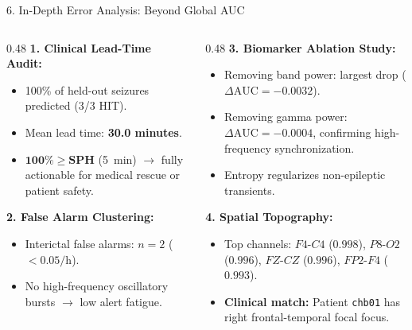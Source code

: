 \documentclass[aspectratio=169,10pt]{beamer}
\begin{document}
\begin{frame}{6. In-Depth Error Analysis: Beyond Global AUC}
\begin{columns}[T]
\begin{column}{0.48\textwidth}
\textbf{1. Clinical Lead-Time Audit:}
\begin{itemize}
    \item 100\% of held-out seizures predicted (3/3 HIT).
    \item Mean lead time: \textbf{30.0 minutes}.
    \item $\mathbf{100\% \ge SPH}$ (5~min) $\to$ fully actionable for medical rescue or patient safety.
\end{itemize}

\vspace{0.2cm}
\textbf{2. False Alarm Clustering:}
\begin{itemize}
    \item Interictal false alarms: $n=2$ ($<0.05/\text{h}$).
    \item No high-frequency oscillatory bursts $\to$ low alert fatigue.
\end{itemize}
\end{column}

\begin{column}{0.48\textwidth}
\textbf{3. Biomarker Ablation Study:}
\begin{itemize}
    \item Removing band power: largest drop ($\Delta\text{AUC} = -0.0032$).
    \item Removing gamma power: $\Delta\text{AUC} = -0.0004$, confirming high-frequency synchronization.
    \item Entropy regularizes non-epileptic transients.
\end{itemize}

\vspace{0.2cm}
\textbf{4. Spatial Topography:}
\begin{itemize}
    \item Top channels: $F4\text{-}C4$ ($0.998$), $P8\text{-}O2$ ($0.996$), $FZ\text{-}CZ$ ($0.996$), $FP2\text{-}F4$ ($0.993$).
    \item \textbf{Clinical match:} Patient \texttt{chb01} has right frontal-temporal focal focus.
\end{itemize}
\end{column}
\end{columns}
\end{frame}
\end{document}
